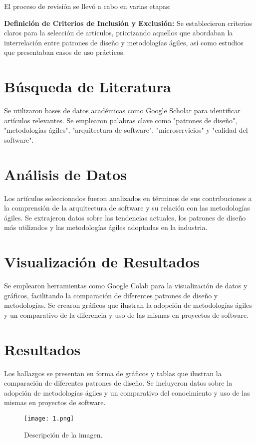 \documentclass{article}
\begin{document}
El proceso de revisión se llevó a cabo en varias etapas:

\textbf{Definición de Criterios de Inclusión y Exclusión:} Se establecieron criterios claros para la selección de artículos, priorizando aquellos que abordaban la interrelación entre patrones de diseño y metodologías ágiles, así como estudios que presentaban casos de uso prácticos.

\section{Búsqueda de Literatura}
Se utilizaron bases de datos académicas como Google Scholar para identificar artículos relevantes. Se emplearon palabras clave como "patrones de diseño", "metodologías ágiles", "arquitectura de software", "microservicios" y "calidad del software".

\section{Análisis de Datos}
Los artículos seleccionados fueron analizados en términos de sus contribuciones a la comprensión de la arquitectura de software y su relación con las metodologías ágiles. Se extrajeron datos sobre las tendencias actuales, los patrones de diseño más utilizados y las metodologías ágiles adoptadas en la industria.

\section{Visualización de Resultados}
Se emplearon herramientas como Google Colab para la visualización de datos y gráficos, facilitando la comparación de diferentes patrones de diseño y metodologías. Se crearon gráficos que ilustran la adopción de metodologías ágiles y un comparativo de la diferencia y uso de las mismas en proyectos de software.

\section{Resultados}
Los hallazgos se presentan en forma de gráficos y tablas que ilustran la comparación de diferentes patrones de diseño. Se incluyeron datos sobre la adopción de metodologías ágiles y un comparativo del conocimiento y uso de las mismas en proyectos de software.

\begin{figure}[h] %
    \centering %
    \texttt{[image: 1.png]} %
    \caption{Descripción de la imagen.} %
    \label{fig:mi_imagen} %
\end{figure}
\end{document}
